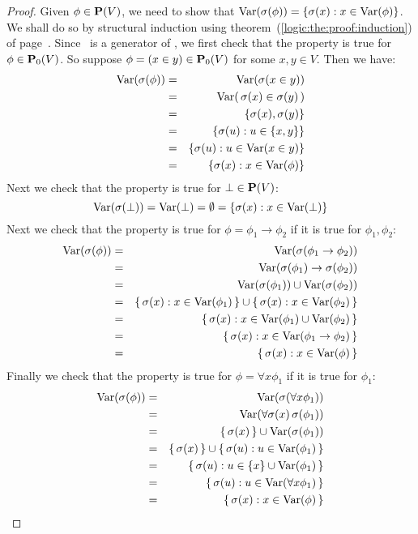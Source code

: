 \begin{proof}
Given $\phi\in\mbox{${\bf P}(V)$}$, we need to show that
$\mbox{\rm Var}(\sigma(\phi))=\{\sigma(x):x\in\mbox{\rm Var}(\phi)\}$. We shall do so by
structural induction using theorem~(\ref{logic:the:proof:induction})
of page~\pageref{logic:the:proof:induction}. Since \pvo\ is a
generator of \pv, we first check that the property is true for
$\phi\in\mbox{${\bf P}_{0}(V)$}$. So suppose $\phi=(x\in y)\in\mbox{${\bf P}_{0}(V)$}$ for some $x,y\in
V$. Then we have:
    \begin{eqnarray*}
        \mbox{\rm Var}(\sigma(\phi))&=&\mbox{\rm Var}(\sigma(x\in y))\\
        &=&\mbox{\rm Var}(\,\sigma(x)\in\sigma(y)\,)\\
        &=&\{\sigma(x),\sigma(y)\}\\
        &=&\{\sigma(u):u\in\{x,y\}\}\\
        &=&\{\sigma(u):u\in\mbox{\rm Var}(x\in y)\}\\
        &=&\{\sigma(x):x\in\mbox{\rm Var}(\phi)\}
    \end{eqnarray*}
Next we check that the property is true for $\bot\in\mbox{${\bf P}(V)$}$:
    \[
        \mbox{\rm Var}(\sigma(\bot))
        =
        \mbox{\rm Var}(\bot)
        =
        \emptyset
        =
        \{\sigma(x):x\in\mbox{\rm Var}(\bot)\}
    \]
Next we check that the property is true for
$\phi=\phi_{1}\to\phi_{2}$ if it is true for $\phi_{1},\phi_{2}$:
    \begin{eqnarray*}
        \mbox{\rm Var}(\sigma(\phi))&=&\mbox{\rm Var}(\sigma(\phi_{1}\to\phi_{2}))
        \\
        &=&\mbox{\rm Var}(\sigma(\phi_{1})\to\sigma(\phi_{2}))
        \\
        &=&\mbox{\rm Var}(\sigma(\phi_{1}))\cup\mbox{\rm Var}(\sigma(\phi_{2}))
        \\
        &=&\{\,\sigma(x):x\in\mbox{\rm Var}(\phi_{1})\,\}
            \cup\{\,\sigma(x):x\in\mbox{\rm Var}(\phi_{2})\,\}
        \\
        &=&\{\,\sigma(x):x\in\mbox{\rm Var}(\phi_{1})\cup\mbox{\rm Var}(\phi_{2})\,\}
        \\
        &=&\{\,\sigma(x):x\in\mbox{\rm Var}(\phi_{1}\to\phi_{2})\,\}
        \\
        &=&\{\,\sigma(x):x\in\mbox{\rm Var}(\phi)\,\}
    \end{eqnarray*}
Finally we check that the property is true for $\phi=\forall
x\phi_{1}$ if it is true for $\phi_{1}$:
    \begin{eqnarray*}
        \mbox{\rm Var}(\sigma(\phi))&=&\mbox{\rm Var}(\sigma(\forall x\phi_{1}))
        \\
        &=&\mbox{\rm Var}(\forall\sigma(x)\,\sigma(\phi_{1}))
        \\
        &=&\{\,\sigma(x)\,\}\cup\mbox{\rm Var}(\sigma(\phi_{1}))
        \\
        &=&\{\,\sigma(x)\,\}\cup\{\,\sigma(u):u\in\mbox{\rm Var}(\phi_{1})\,\}
        \\
        &=&\{\,\sigma(u):u\in\{x\}\cup\mbox{\rm Var}(\phi_{1})\,\}
        \\
        &=&\{\,\sigma(u):u\in\mbox{\rm Var}(\forall x\phi_{1})\,\}
        \\
        &=&\{\,\sigma(x):x\in\mbox{\rm Var}(\phi)\,\}
    \end{eqnarray*}
\end{proof}

